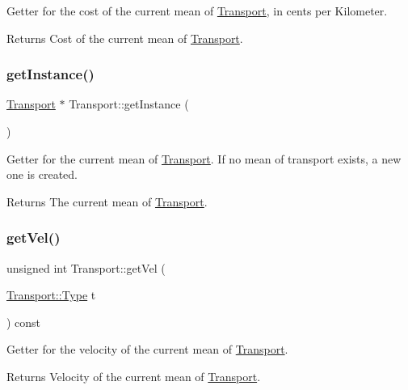Getter for the cost of the current mean of \hyperlink{class_transport}{Transport}, in cents per Kilometer.

\begin{DoxyReturn}{Returns}
Cost of the current mean of \hyperlink{class_transport}{Transport}. 
\end{DoxyReturn}
\hypertarget{class_transport_a2265878b8225332acf586bece5f1b324}{}\label{class_transport_a2265878b8225332acf586bece5f1b324} 
\subsubsection{\texorpdfstring{get\+Instance()}{getInstance()}}
{\footnotesize\ttfamily \hyperlink{class_transport}{Transport} $\ast$ Transport\+::get\+Instance (\begin{DoxyParamCaption}{ }\end{DoxyParamCaption})\hspace{0.3cm}{\ttfamily [static]}}

Getter for the current mean of \hyperlink{class_transport}{Transport}. If no mean of transport exists, a new one is created.

\begin{DoxyReturn}{Returns}
The current mean of \hyperlink{class_transport}{Transport}. 
\end{DoxyReturn}
\hypertarget{class_transport_ae9b8f3d27331e429160827194e32bde1}{}\label{class_transport_ae9b8f3d27331e429160827194e32bde1} 
\subsubsection{\texorpdfstring{get\+Vel()}{getVel()}}
{\footnotesize\ttfamily unsigned int Transport\+::get\+Vel (\begin{DoxyParamCaption}\item[{\hyperlink{class_transport_a1879cecfed0d4238e5a7af6d085db317}{Transport\+::\+Type}}]{t }\end{DoxyParamCaption}) const}

Getter for the velocity of the current mean of \hyperlink{class_transport}{Transport}.

\begin{DoxyReturn}{Returns}
Velocity of the current mean of \hyperlink{class_transport}{Transport}. 
\end{DoxyReturn}


